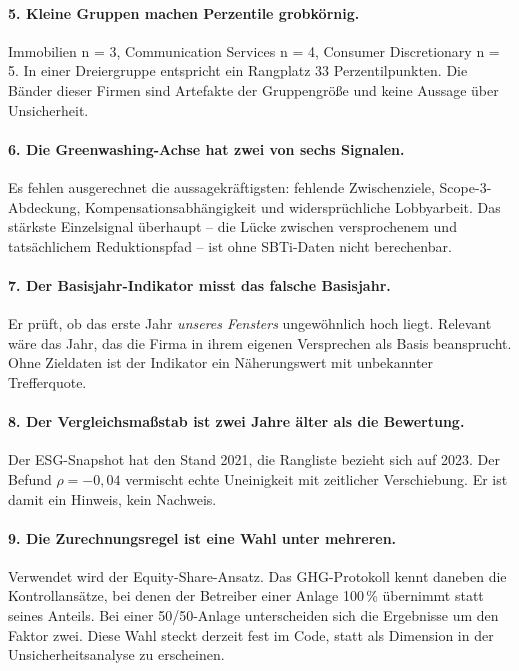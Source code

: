 \documentclass[11pt,a4paper]{article}
\begin{document}
\paragraph{5. Kleine Gruppen machen Perzentile grobkörnig.}
Immobilien n = 3, Communication Services n = 4, Consumer Discretionary n = 5. In einer Dreiergruppe entspricht ein Rangplatz 33 Perzentilpunkten. Die Bänder dieser Firmen sind Artefakte der Gruppengröße und keine Aussage über Unsicherheit.

\paragraph{6. Die Greenwashing-Achse hat zwei von sechs Signalen.}
Es fehlen ausgerechnet die aussagekräftigsten: fehlende Zwischenziele, Scope-3-Abdeckung, Kompensations\-abhängigkeit und widersprüchliche Lobbyarbeit. Das stärkste Einzelsignal überhaupt -- die Lücke zwischen versprochenem und tatsächlichem Reduktionspfad -- ist ohne SBTi-Daten nicht berechenbar.

\paragraph{7. Der Basisjahr-Indikator misst das falsche Basisjahr.}
Er prüft, ob das erste Jahr \emph{unseres Fensters} ungewöhnlich hoch liegt. Relevant wäre das Jahr, das die Firma in ihrem eigenen Versprechen als Basis beansprucht. Ohne Zieldaten ist der Indikator ein Näherungswert mit unbekannter Trefferquote.

\paragraph{8. Der Vergleichsmaßstab ist zwei Jahre älter als die Bewertung.}
Der ESG-Snapshot hat den Stand 2021, die Rangliste bezieht sich auf 2023. Der Befund $\rho = -0{,}04$ vermischt echte Uneinigkeit mit zeitlicher Verschiebung. Er ist damit ein Hinweis, kein Nachweis.

\paragraph{9. Die Zurechnungsregel ist eine Wahl unter mehreren.}
Verwendet wird der Equity-Share-Ansatz. Das GHG-Protokoll kennt daneben die Kontrollansätze, bei denen der Betreiber einer Anlage 100\,\% übernimmt statt seines Anteils. Bei einer 50/50-Anlage unterscheiden sich die Ergebnisse um den Faktor zwei. Diese Wahl steckt derzeit fest im Code, statt als Dimension in der Unsicherheitsanalyse zu erscheinen.
\end{document}
